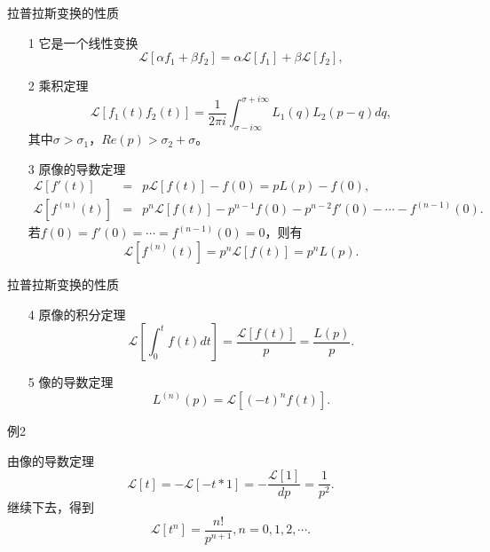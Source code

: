 \documentclass[11pt]{beamer}
\begin{document}
\begin{frame}{拉普拉斯变换的性质}

\begin{itemize}
\item [1] 它是一个线性变换
\begin{equation}
\mathscr{L} [ \alpha f_1 + \beta f_2 ] = \alpha \mathscr{L}[f_1] + \beta \mathscr{L}[ f_2 ],
\end{equation}

\item [2] 乘积定理
\begin{equation}
\mathscr{L}[f_1(t) f_2(t) ] = \frac{1}{2\pi i} \int^{\sigma + i\infty}_{\sigma - i\infty} L_1(q) L_2(p-q) dq,
\end{equation}
其中$\sigma > \sigma_1$，$Re(p) > \sigma_2 + \sigma$。

\item [3] 原像的导数定理
\begin{eqnarray}
\mathscr{L}[f'(t)] &=& p \mathscr{L}[f(t)] - f(0) = p L(p) - f(0),
\nonumber\\
\mathscr{L}[f^{(n)}(t)] &=& p^n \mathscr{L}[f(t)] - p^{n-1} f(0) - p^{n-2} f'(0) - \cdots - f^{(n-1)}(0). \nonumber
\end{eqnarray}
若$f(0) = f'(0) = \cdots = f^{(n-1)}(0) = 0$，则有
\begin{equation}
\mathscr{L}[ f^{(n)}(t) ] = p^n \mathscr{L}[ f(t) ] = p^n L(p).
\end{equation}
\end{itemize}
\end{frame}

\begin{frame}{拉普拉斯变换的性质}
\begin{itemize}
\item [4] 原像的积分定理
\begin{equation}
\mathscr{L}[ \int^t_0 f(t)dt ] = \frac{ \mathscr{L}[f(t)]}{p} = \frac{L(p)}{p}.
\end{equation}
\item [5] 像的导数定理
\begin{equation}
L^{(n)}(p) = \mathscr{L}[ (-t)^n f(t) ].
\end{equation}


\end{itemize}

\end{frame}

\begin{frame}{例2}

由像的导数定理
\begin{equation}
\mathscr{L}[t] = - \mathscr{L}[ -t * 1 ] = - \frac{\mathscr{L}[1]}{dp} = \frac{1}{p^2}.
\end{equation}
继续下去，得到
\begin{equation}
\mathscr{L}[t^n] = \frac{n!}{p^{n+1}}, n=0,1,2,\cdots.
\end{equation}

\end{frame}
\end{document}
